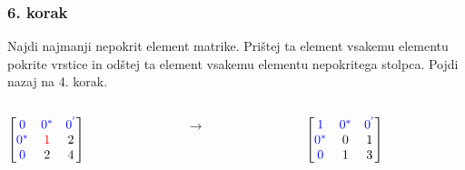 \documentclass{beamer}
\begin{document}
\begin{frame}
    \frametitle{6. korak}
    \begin{block}{}
        Najdi najmanji nepokrit element matrike. Prištej ta element vsakemu elementu
        pokrite vrstice in odštej ta element vsakemu elementu nepokritega stolpca.
        Pojdi nazaj na 4. korak.
    \end{block}
    \hfill
    \begin{columns}[t]
        \begin{column}{0.25\linewidth}
            $\begin{bmatrix}
                \textcolor{blue}{0} & \textcolor{blue}{0^{*}} & \textcolor{blue}{0^{'}}\\
                \textcolor{blue}{0^{*}} & \textcolor{red}{1} & 2\\
                \textcolor{blue}{0} & 2 & 4\\	
            \end{bmatrix}$
        \end{column}
        \begin{column}{0.25\linewidth}
         \centering
         $ \rightarrow $
        \end{column}
        \hfill
        \begin{column}{0.25\linewidth}
            \centering
            $\begin{bmatrix}
                \textcolor{blue}{1} & \textcolor{blue}{0^{*}} & \textcolor{blue}{0^{'}}\\
                \textcolor{blue}{0^{*}} & 0 & 1\\
                \textcolor{blue}{0} & 1 & 3\\
            \end{bmatrix}$
        \end{column}
    \end{columns}
\end{frame}
\end{document}
